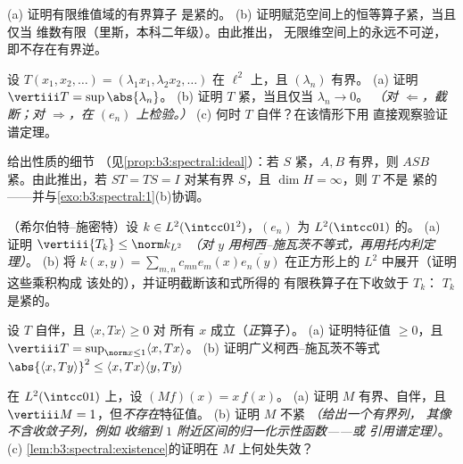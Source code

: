 \begin{exercise}[$\star$]\label{exo:b3:spectral:1}
(a) 证明有限维值域的有界算子
是紧的。
(b) 证明赋范空间上的恒等算子紧，当且仅当
维数有限（里斯，本科二年级）。由此推出，
无限维空间上的永远不可逆，
即不存在有界逆。
\end{exercise}

\begin{exercise}[$\star$]\label{exo:b3:spectral:2}
设 $T(x_1, x_2, \dots) = (\lambda_1x_1, \lambda_2x_2, \dots)$
在 $\ell^2$ 上，且 $(\lambda_n)$ 有界。
(a) 证明 $\vertiii T = \sup\abs{\lambda_n}$。
(b) 证明 $T$ 紧，当且仅当 $\lambda_n \to 0$。
\emph{（对 $\Leftarrow$，截断；对 $\Rightarrow$，在
$(e_n)$ 上检验。）}
(c) 何时 $T$ 自伴？在该情形下用
直接观察验证谱定理。
\end{exercise}

\begin{exercise}[$\star\star$]\label{exo:b3:spectral:3}
给出性质的细节
（见\cref{prop:b3:spectral:ideal}）：若 $S$ 紧，$A, B$
有界，则 $ASB$ 紧。由此推出，若 $ST = TS = I$
对某有界 $S$，且 $\dim H = \infty$，则 $T$ 不是
紧的——并与\cref{exo:b3:spectral:1}(b)协调。
\end{exercise}

\begin{exercise}[$\star\star$]\label{exo:b3:spectral:4}
（希尔伯特–施密特）设 $k \in L^2(\intcc01^2)$，$(e_n)$ 为
$L^2(\intcc01)$ 的。
(a) 证明 $\vertiii{T_k} \leq \norm k_{L^2}$
\emph{（对 $y$ 用柯西–施瓦茨不等式，再用托内利定理）}。
(b) 将 $k(x,y) = \sum_{m,n}c_{mn}e_m(x)\overline{e_n(y)}$
在正方形上的 $L^2$ 中展开（证明这些乘积构成
该处的），并证明截断该和式所得的
有限秩算子在下收敛于 $T_k$：
$T_k$ 是紧的。
\end{exercise}

\begin{exercise}[$\star\star$]\label{exo:b3:spectral:5}
设 $T$ 自伴，且 $\langle x, Tx\rangle \geq 0$ 对
所有 $x$ 成立（\emph{正}算子）。
(a) 证明特征值 $\geq 0$，且 $\vertiii T =
\sup_{\norm x\leq1}\langle x, Tx\rangle$。
(b) 证明广义柯西–施瓦茨不等式
$\abs{\langle x, Ty\rangle}^2 \leq \langle x, Tx\rangle\langle
y, Ty\rangle$
\end{exercise}

\begin{exercise}[$\star\star$]\label{exo:b3:spectral:6}
在 $L^2(\intcc01)$ 上，设 $(Mf)(x) = x\,f(x)$。
(a) 证明 $M$ 有界、自伴，且 $\vertiii M =
1$，但\emph{不存在}特征值。
(b) 证明 $M$ 不紧 \emph{（给出一个有界列，
其像不含收敛子列，例如
收缩到 $1$ 附近区间的归一化示性函数——或
引用谱定理）}。
(c) \cref{lem:b3:spectral:existence}的证明在
$M$ 上何处失效？
\end{exercise}

